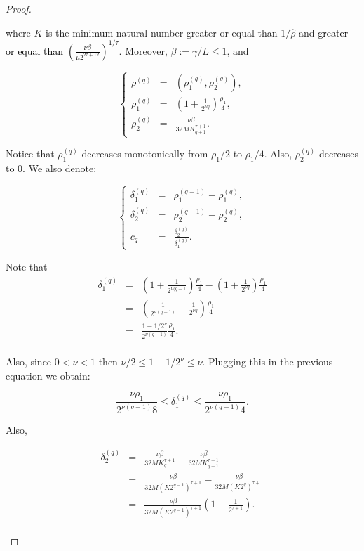 \begin{proof}
\begin{enumerate}
where  $K$ is the minimum natural number greater or equal than $1/\hat \rho$ and \textcolor{black}{greater or equal than $(\frac{\nu\beta}{\mu 2^{2\tau+12}})^{1/\tau}$}. Moreover, $\beta:= \gamma/L \leq 1$, and

$$
\left\{
\begin{array}{rcl}
 \rho^{(q)}& = & (\rho_1^{(q)}, \rho_2^{(q)}), \\
 \rho_1^{(q)}& = & (1+\frac{1}{2^{\nu q}})\frac{\rho_1}{4}, \\
 \rho_2^{(q)}& = & \frac{\nu\beta}{32 M K_{q+1}^{\tau+1}}.
\end{array}
\right.
$$

Notice that $\rho_1^{(q)}$ decreases monotonically from $\rho_1/2$ to $\rho_1/4$. Also, $\rho_2^{(q)}$ decreases to 0. We also denote:

$$
\left\{
\begin{array}{rcl}
 \delta_1^{(q)} & = & \rho_1^{(q-1)} - \rho_1^{(q)}, \\
 \delta_2^{(q)} &= &\rho_2^{(q-1)}-\rho_2^{(q)}, \\
 c_q & = & \frac{\delta_2^{(q)}}{\delta_1^{(q)}}.
\end{array}
\right.
$$

Note that
$$
\begin{array}{rcl}
\delta_1^{(q)} & = & \left(1+\frac{1}{2^{\nu(q-1}}\right)\frac{\rho_1}{4}-\left(1 + \frac{1}{2^{\nu q}}\right)\frac{\rho_1}{4} \\
& = & \left(\frac{1}{2^{\nu(q-1)}} - \frac{1}{2^{\nu q}}\right)\frac{\rho_1}{4} \\
& = & \frac{1 - 1/2^\nu}{2^{\nu(q-1)}}\frac{\rho_1}{4}.\\
\end{array}
$$

Also, since $0 < \nu < 1$ then $\nu/2 \leq 1-1/2^\nu \leq \nu$. Plugging this in the previous equation we obtain:

\begin{equation}\label{eq:delta1ineq}
\frac{\nu \rho_1}{2^{\nu(q-1)}8} \leq \delta_1^{(q)} \leq \frac{\nu \rho_1}{2^{\nu(q-1)}4}.
\end{equation}

Also,

$$
\begin{array}{rcl}
\delta_2^{(q)} & = & \frac{\nu \beta}{32 M K_q^{\tau+1}} - \frac{\nu \beta}{32 M K_{q+1}^{\tau+1}}\\
& = & \frac{\nu \beta}{32M (K2^{q-1})^{\tau+1}} - \frac{\nu \beta}{32 M (K 2^q)^{\tau+1}}\\
& = & \frac{\nu \beta}{32M(K2^{q-1})^{\tau + 1}}\left(1-\frac{1}{2^{\tau+1}}\right) .\\
\end{array}
$$


\end{enumerate}
\end{proof}
